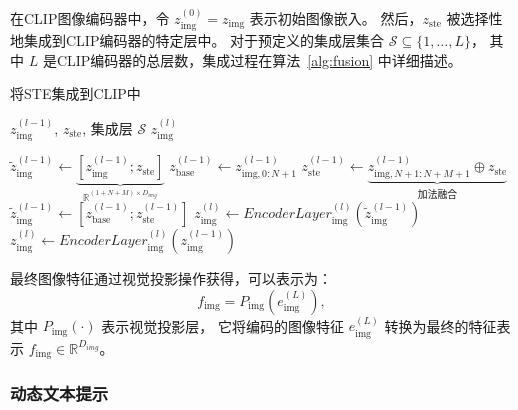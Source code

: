 在CLIP图像编码器中，令 $ z_{\mathrm{img}}^{(0)} = z_{\mathrm{img}} $ 表示初始图像嵌入。
然后，$ z_{\mathrm{ste}} $ 被选择性地集成到CLIP编码器的特定层中。
对于预定义的集成层集合 $ \mathcal{S} \subseteq \{1, \dots, L\} $，
其中 $ L $ 是CLIP编码器的总层数，集成过程在算法~\ref{alg:fusion} 中详细描述。

\begin{algorithm}[!ht]
\caption{将STE集成到CLIP中}\label{alg:fusion}
\begin{algorithmic}[1]
\Require ${z}_{\text{img}}^{(l-1)}$, $z_{\text{ste}} $, 集成层 $\mathcal{S}$
\Ensure ${z}_{\text{img}}^{(l)}$

        \State $\widetilde{z}_{\text{img}}^{(l-1)} \gets 
               \underbrace{\left[ z_{\text{img}}^{(l-1)} ;z_{\text{ste}} \right]}_{\mathbb{R}^{(1+N+M)\times D_{img}}}$ 
         \label{line:concat}
    \Else
        \State $z_{\text{base}}^{(l-1)} \gets z_{\text{img},0:N+1}^{(l-1)}$ 
                \label{line:base}
        \State $z_{\text{ste}}^{(l-1)} \gets 
               \underbrace{z_{\text{img},N+1:N+M+1}^{(l-1)} \oplus z_{\text{ste}}}_{\text{加法融合}}$ 
               \label{line:fusion}
        \State $\widetilde{z}_{\text{img}}^{(l-1)} \gets 
               \left[ z_{\text{base}}^{(l-1)} ; z_{\text{ste}}^{(l-1)} \right]$ \label{line:merge}
    \EndIf
    \State ${z}_{\text{img}}^{(l)} \gets 
           EncoderLayer_{\text{img}}^{(l)}\left( \widetilde{z}_{\text{img}}^{(l-1)} \right)$ \label{line:encode}
\Else
    \State ${z}_{\text{img}}^{(l)} \gets 
           EncoderLayer_{\text{img}}^{(l)}\left( z_{\text{img}}^{(l-1)} \right)$ \label{line:bypass}
\EndIf
\end{algorithmic}
\end{algorithm}

最终图像特征通过视觉投影操作获得，可以表示为：
\begin{equation}
    f_{\text{img}} = P_{\text{img}}\left(e_{\text{img}}^{(L)}\right),
\end{equation}
其中 $ P_{\text{img}}(\cdot) $ 表示视觉投影层，
它将编码的图像特征 $ e_{\text{img}}^{(L)} $ 转换为最终的特征表示 $ f_{\text{img}}\in \mathbb{R}^{D_{img}} $。

\subsubsection{动态文本提示}
\label{sec:DTP}

